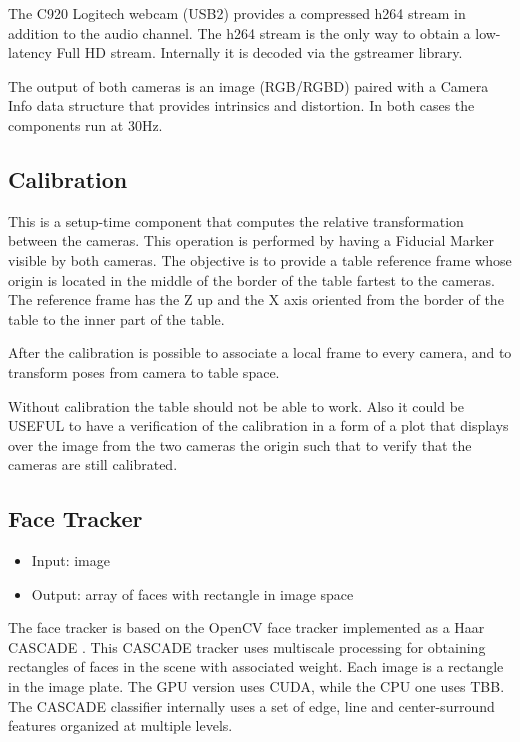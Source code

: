 \documentclass[a4paper,notitlepage,onecolumn]{hitec}  %
\begin{document}
The C920 Logitech webcam (USB2) provides a compressed h264 stream in addition to the audio channel. The h264 stream is the only way to obtain a low-latency Full HD stream. Internally it is decoded via the gstreamer library. 

The output of both cameras is an image (RGB/RGBD) paired with a Camera Info data structure that provides intrinsics and distortion. In both cases the components run at 30Hz.


\subsection{Calibration}

This is a setup-time component that computes the relative transformation between the cameras. This operation is performed by having a Fiducial Marker visible by both cameras. The objective is to provide a table reference frame whose origin is located in the middle of the border of the table fartest to the cameras. The reference frame has the Z up and the X axis oriented from the border of the table to the inner part of the table.

After the calibration is possible to associate a local frame to every camera, and to transform poses from camera to table space.

Without calibration the table should not be able to work. Also it could be USEFUL to have a verification of the calibration in a form of a plot that displays over the image from the two cameras the origin such that to verify that the cameras are still calibrated. 

\subsection{Face Tracker}

\begin{itemize}
	\item Input: image
	\item Output: array of faces with rectangle in image space
\end{itemize}

The face tracker is based on the OpenCV face tracker implemented as a Haar CASCADE \cite{viola2004robust}. This CASCADE tracker uses multiscale processing for obtaining rectangles of faces in the scene with associated weight. Each image is a rectangle in the image plate. The GPU version uses CUDA, while the CPU one uses TBB. The CASCADE classifier internally uses a set of edge, line and center-surround features organized at multiple levels.
\end{document}
